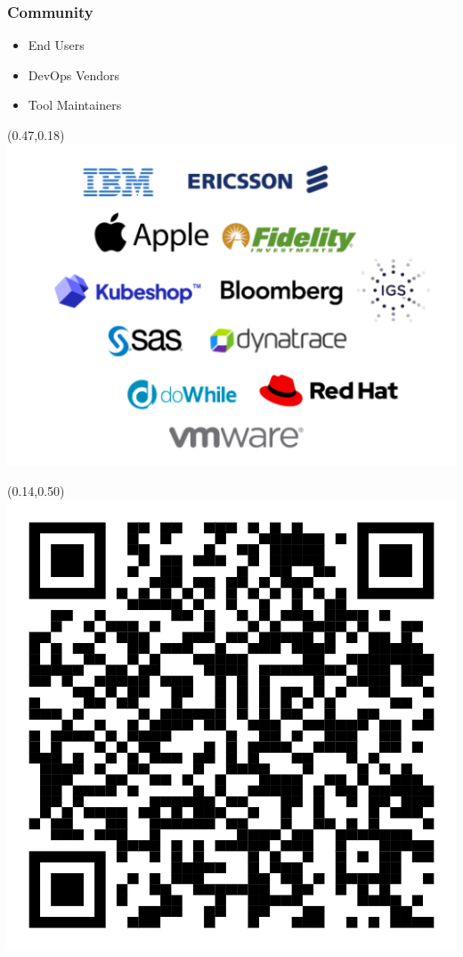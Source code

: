 \documentclass[aspectratio=169,11pt,hyperref={colorlinks=true}]{beamer}
\begin{document}
\begin{blackframe}
  \frametitle{Community}
  \begin{itemize}
    \item End Users\\
    \item DevOps Vendors\\
    \item Tool Maintainers\\
  \end{itemize}
  \vspace{0.3\textheight}
  \begin{textblock*}{0.50\paperwidth}(0.47\paperwidth,0.18\paperheight)
    \includegraphics[width=0.50\paperwidth]{img/cdevents-community.png}
  \end{textblock*}
  \begin{textblock*}{0.15\paperwidth}(0.14\paperwidth,0.50\paperheight)
    \includegraphics[width=0.15\paperwidth]{img/cdevents_community_qr.png}
  \end{textblock*}
\end{blackframe}
\end{document}
